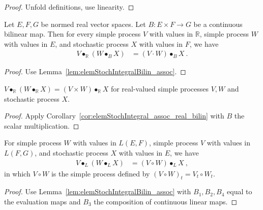 \begin{proof}
  \leanok
Unfold definitions, use linearity.
\end{proof}


\begin{corollary}\label{cor:elemStochIntegral_assoc_real_bilin}
Let $E, F, G$ be normed real vector spaces.
Let $B : E \times F \to G$ be a continuous bilinear map.
Then for every simple process $V$ with values in $\mathbb{R}$, simple process $W$ with values in $E$, and stochastic process $X$ with values in $F$, we have
\begin{align*}
  V \bullet_{\mathbb{R}} (W \bullet_{B} X)
  &= (V \cdot W) \bullet_{B} X
  \: .
\end{align*}
\end{corollary}

\begin{proof}
Use Lemma~\ref{lem:elemStochIntegralBilin_assoc}.
\end{proof}


\begin{lemma}\label{lem:elemStochIntegral_assoc}
$V \bullet_{\mathbb{R}} (W \bullet_{\mathbb{R}} X) = (V \times W) \bullet_{\mathbb{R}} X$ for real-valued simple processes $V, W$ and stochastic process $X$.
\end{lemma}

\begin{proof}
Apply Corollary~\ref{cor:elemStochIntegral_assoc_real_bilin} with $B$ the scalar multiplication.
\end{proof}


\begin{lemma}\label{lem:elemStochIntegralLinear_assoc}
  \leanok
For simple process $W$ with values in $L(E, F)$, simple process $V$ with values in $L(F, G)$, and stochastic process $X$ with values in $E$, we have
\begin{align*}
  V \bullet_L (W \bullet_L X)
  &= (V \circ W) \bullet_L X
  \: ,
\end{align*}
in which $V \circ W$ is the simple process defined by $(V \circ W)_t = V_t \circ W_t$.
\end{lemma}

\begin{proof}
  \leanok
Use Lemma~\ref{lem:elemStochIntegralBilin_assoc} with $B_1, B_2, B_4$ equal to the evaluation maps and $B_3$ the composition of continuous linear maps.
\end{proof}


